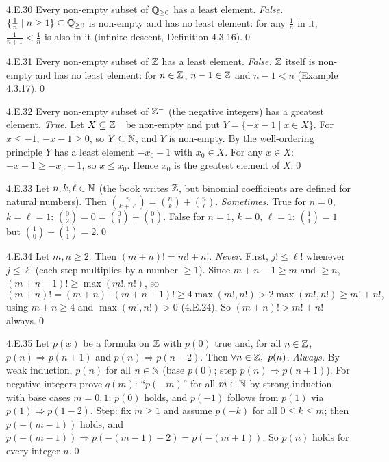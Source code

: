 \begin{bookex}[essential]{4.E.30}
Every non-empty subset of $\mathbb{Q}_{\ge0}$ has a least element.
\solution
\emph{False.} $\{\frac1n\mid n\ge1\}\subseteq\mathbb{Q}_{\ge0}$ is non-empty and has no least element: for any $\frac1n$ in it, $\frac1{n+1}<\frac1n$ is also in it (infinite descent, Definition 4.3.16).\qed
\end{bookex}

\begin{bookex}[essential]{4.E.31}
Every non-empty subset of $\mathbb{Z}$ has a least element.
\solution
\emph{False.} $\mathbb{Z}$ itself is non-empty and has no least element: for $n\in\mathbb{Z}$, $n-1\in\mathbb{Z}$ and $n-1<n$ (Example 4.3.17).\qed
\end{bookex}

\begin{bookex}[essential]{4.E.32}
Every non-empty subset of $\mathbb{Z}^-$ (the negative integers) has a greatest element.
\solution
\emph{True.} Let $X\subseteq\mathbb{Z}^-$ be non-empty and put $Y=\{-x-1\mid x\in X\}$. For $x\le-1$, $-x-1\ge0$, so $Y\subseteq\mathbb{N}$, and $Y$ is non-empty. By the well-ordering principle $Y$ has a least element $-x_0-1$ with $x_0\in X$. For any $x\in X$: $-x-1\ge-x_0-1$, so $x\le x_0$. Hence $x_0$ is the greatest element of $X$.\qed
\end{bookex}

\begin{bookex}[recommended]{4.E.33}
Let $n,k,\ell\in\mathbb{N}$ (the book writes $\mathbb{Z}$, but binomial coefficients are defined for natural numbers). Then $\binom n{k+\ell}=\binom nk+\binom n\ell$.
\solution
\emph{Sometimes.} True for $n=0$, $k=\ell=1$: $\binom02=0=\binom01+\binom01$. False for $n=1$, $k=0$, $\ell=1$: $\binom11=1$ but $\binom10+\binom11=2$.\qed
\end{bookex}

\begin{bookex}[recommended]{4.E.34}
Let $m,n\ge2$. Then $(m+n)!=m!+n!$.
\solution
\emph{Never.} First, $j!\le\ell!$ whenever $j\le\ell$ (each step multiplies by a number $\ge1$). Since $m+n-1\ge m$ and $\ge n$, $(m+n-1)!\ge\max(m!,n!)$, so
\[
(m+n)!=(m+n)\cdot(m+n-1)!\ge4\max(m!,n!)>2\max(m!,n!)\ge m!+n!,
\]
using $m+n\ge4$ and $\max(m!,n!)>0$ (4.E.24). So $(m+n)!>m!+n!$ always.\qed
\end{bookex}

\begin{bookex}[recommended]{4.E.35}
Let $p(x)$ be a formula on $\mathbb{Z}$ with $p(0)$ true and, for all $n\in\mathbb{Z}$, $p(n)\Rightarrow p(n+1)$ and $p(n)\Rightarrow p(n-2)$. Then $\forall n\in\mathbb{Z},\ p(n)$.
\solution
\emph{Always.} By weak induction, $p(n)$ for all $n\in\mathbb{N}$ (base $p(0)$; step $p(n)\Rightarrow p(n+1)$). For negative integers prove $q(m)$: ``$p(-m)$'' for all $m\in\mathbb{N}$ by strong induction with base cases $m=0,1$: $p(0)$ holds, and $p(-1)$ follows from $p(1)$ via $p(1)\Rightarrow p(1-2)$. Step: fix $m\ge1$ and assume $p(-k)$ for all $0\le k\le m$; then $p(-(m-1))$ holds, and $p(-(m-1))\Rightarrow p(-(m-1)-2)=p(-(m+1))$. So $p(n)$ holds for every integer $n$.\qed
\end{bookex}
